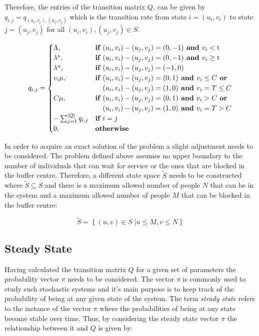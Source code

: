 Therefore, the entries of the transition matrix \(Q\), can be given by 
\( q_{i,j} = q_{(u_i, v_i),(u_j, v_j)} \) which is the transition rate from state 
\( i = (u_i, v_i) \) to state \( j = (u_j , v_j) \) for all 
\( (u_i, v_i), (u_j, v_j) \in S \).

\begin{equation} \label{eq:markov_transition_rate}
    q_{i, j} = 
    \begin{cases}
        \Lambda, & \textbf{if } (u_i, v_i) - (u_j, v_j) = (0,-1) \textbf{ and } 
        v_i < \text{t} \\
        \lambda^o, & \textbf{if } (u_i, v_i) - (u_j, v_j) = (0,-1) \textbf{ and } 
        v_i \geq \text{t} \\
        \lambda^a, & \textbf{if } (u_i, v_i) - (u_j, v_j) = (-1,0) \\
        v_i \mu, & \textbf{if } (u_i, v_i) - (u_j, v_j) = (0,1) \textbf{ and } 
        v_i \leq C \textbf{ or} \\ & \hspace{0.37cm}(u_i, v_i) - (u_j, v_j) = (1,0) 
        \textbf{ and } v_i = T \leq C \\
        C \mu, & \textbf{if } (u_i, v_i) - (u_j, v_j) = (0,1) \textbf{ and } v_i > C 
        \textbf{ or} \\ & \hspace{0.37cm}(u_i, v_i) - (u_j, v_j) = (1,0) \textbf{ and } 
        v_i = T > C\\
        -\sum_{j=1}^{|Q|}{q_{i,j}} & \textbf{if } i = j \\
        0, & \textbf{otherwise}
    \end{cases}
\end{equation}

In order to acquire an exact solution of the problem a slight adjustment needs to 
be considered. 
The problem defined above assumes no upper boundary to the number of individuals 
that can wait for service or the ones that are blocked in the buffer centre. 
Therefore, a different state space \( \tilde S \) needs to be constructed where 
\( \tilde S \subseteq S \) and there is a maximum allowed number of people \( N \) 
that can be in the system and a maximum allowed number of people \( M \) that can
be blocked in the buffer centre:

\begin{equation}
    \tilde S = \left\{ (u, v) \in S\;| u \leq M, v\leq N \right\}
\end{equation}


\subsection{Steady State}
Having calculated the transition matrix \( Q \) for a given set of parameters the 
probability vector \( \pi \) needs to be considered. 
The vector \( \pi \) is commonly used to study such stochastic systems and it's 
main purpose is to keep track of the probability of being at any given state of 
the system. 
The term \textit{steady state} refers to the instance of the vector \( \pi \) where 
the probabilities of being at any state become stable over time. 
Thus, by considering the steady state vector \( \pi \) the relationship between 
it and \(Q \) is given by:

